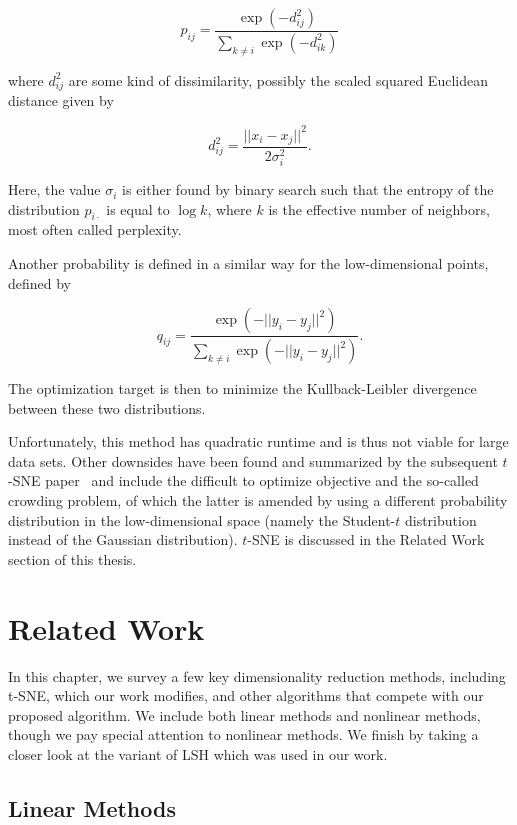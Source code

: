 \begin{equation}
  p_{ij} = \frac{\exp (-d_{ij}^2)}{\sum_{k \neq i} \exp (-d_{ik}^2)}
\end{equation}

where $d_{ij}^2$ are some kind of dissimilarity, possibly the scaled squared
Euclidean distance given by

\begin{equation}
  d_{ij}^2 = \frac{ ||x_i - x_j||^2}{2\sigma_i^2}.
\end{equation}

Here, the value $\sigma_i$ is either found by binary search such that the
entropy of the distribution $p_{i\cdot}$ is equal to $\log k$, where $k$
is the effective number of neighbors, most often called perplexity.

Another probability is defined in a similar way for the low-dimensional
points, defined by

\begin{equation}
  q_{ij} = \frac{\exp (-||y_i - y_j||^2)}{\sum_{k \neq i} \exp (-||y_i - y_j||^2)}.
\end{equation}

The optimization target is then to minimize the Kullback-Leibler divergence between
these two distributions.

Unfortunately, this method has quadratic runtime and is thus not viable for
large data sets. Other downsides have been found and summarized by the subsequent
$t$-SNE paper~\cite{tsne} and include the difficult to optimize objective and the
so-called crowding problem, of which the latter is amended by using a different
probability distribution in the low-dimensional space (namely the Student-$t$ distribution
instead of the Gaussian distribution). $t$-SNE is discussed in the Related Work
section of this thesis.

\chapter{Related Work}\label{ch:related-work}

In this chapter, we survey a few key dimensionality reduction methods,
including t-SNE, which our work modifies, and other algorithms that compete
with our proposed algorithm.  We include both linear methods and nonlinear
methods, though we pay special attention to nonlinear methods. We finish by
taking a closer look at the variant of LSH which was used in our work.

\section{Linear Methods}

